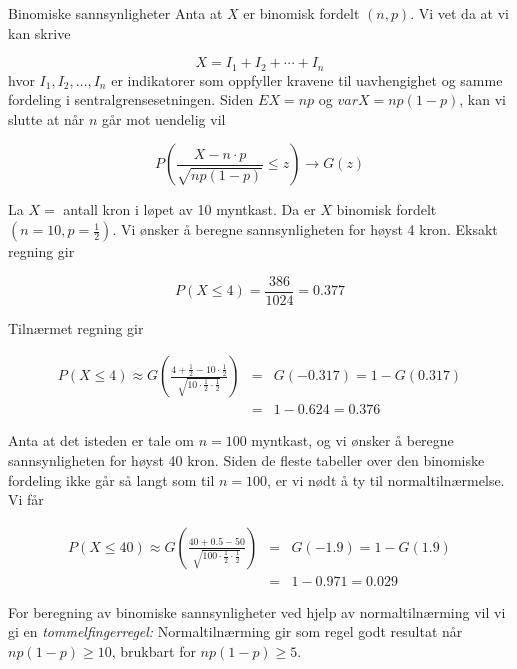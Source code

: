 \begin{eksempel}{Binomiske sannsynligheter}
Anta at $X$ er binomisk fordelt $(n,p)$. Vi vet da at vi kan
skrive 

\[ X=I_1+I_2+\cdots +I_n \]
\noindent hvor $I_1, I_2, \ldots , I_n$ er indikatorer som oppfyller kravene
til uavhengighet og samme fordeling i sentralgrensesetningen.
Siden $EX=np$ og $varX=np(1-p)$, kan vi slutte at når $n$ går mot
uendelig vil

\[  P(\frac{X-n \cdot p}{\sqrt{np(1-p)}}\leq z) \rightarrow G(z) \]

\noindent La $X=$ antall kron i løpet av 10 myntkast. Da er $X$ binomisk
fordelt $(n=10, p=\frac{1}{2})$. Vi ønsker å beregne
sannsynligheten for høyst 4 kron. Eksakt regning gir

\[ P(X \leq 4)=\frac{386}{1024}=0.377 \]

\noindent Tilnærmet regning gir

\begin{eqnarray*}
P(X \leq 4) \approx G(\frac{4+\frac{1}{2}-10 \cdot \frac{1}{2}}
     {\sqrt{10 \cdot \frac{1}{2} \cdot \frac{1}{2}}})&=&G(-0.317)=1-G(0.317)\\
                   &=&1-0.624=0.376
\end{eqnarray*}

\noindent Anta at det isteden er tale om $n=100$ myntkast, og vi ønsker
 å beregne sannsynligheten for høyst 40 kron. Siden de fleste
tabeller over den binomiske fordeling ikke går så langt som til
$n=100$, er vi nødt å ty til normaltilnærmelse. Vi får

\begin{eqnarray*}
P(X \leq 40) \approx G(\frac{40+0.5-50}
     {\sqrt{100 \cdot \frac{1}{2} \cdot \frac{1}{2}}})&=&G(-1.9)=1-G(1.9)\\
                   &=&1-0.971=0.029
\end{eqnarray*}

\noindent For beregning av binomiske sannsynligheter ved hjelp av
normaltilnærming vil vi gi en {\em tommelfingerregel:}
Normaltilnærming gir som regel godt resultat når $np(1-p) \geq 10$,
 brukbart for $np(1-p) \geq 5$. \\
\end{eksempel}

